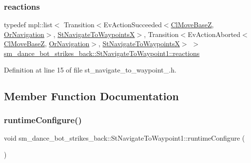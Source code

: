\subsubsection{\texorpdfstring{reactions}{reactions}}
{\footnotesize\ttfamily typedef mpl\+::list$<$ Transition$<$Ev\+Action\+Succeeded$<$\hyperlink{classmove__base__z__client_1_1ClMoveBaseZ}{Cl\+Move\+BaseZ}, \hyperlink{classsm__dance__bot__strikes__back_1_1OrNavigation}{Or\+Navigation}$>$, \hyperlink{structsm__dance__bot__strikes__back_1_1StNavigateToWaypointsX}{St\+Navigate\+To\+WaypointsX}$>$, Transition$<$Ev\+Action\+Aborted$<$\hyperlink{classmove__base__z__client_1_1ClMoveBaseZ}{Cl\+Move\+BaseZ}, \hyperlink{classsm__dance__bot__strikes__back_1_1OrNavigation}{Or\+Navigation}$>$, \hyperlink{structsm__dance__bot__strikes__back_1_1StNavigateToWaypointsX}{St\+Navigate\+To\+WaypointsX}$>$ $>$ \hyperlink{structsm__dance__bot__strikes__back_1_1StNavigateToWaypoint1_a6345cdcfe23da575ea59d70abe738ce1}{sm\+\_\+dance\+\_\+bot\+\_\+strikes\+\_\+back\+::\+St\+Navigate\+To\+Waypoint1\+::reactions}}



Definition at line 15 of file st\+\_\+navigate\+\_\+to\+\_\+waypoint\+\_.\+h.



\subsection{Member Function Documentation}
\mbox{\label{structsm__dance__bot__strikes__back_1_1StNavigateToWaypoint1_ab12f2e6a60fa398d45db6249618c1dcf}} 
\subsubsection{\texorpdfstring{runtime\+Configure()}{runtimeConfigure()}}
{\footnotesize\ttfamily void sm\+\_\+dance\+\_\+bot\+\_\+strikes\+\_\+back\+::\+St\+Navigate\+To\+Waypoint1\+::runtime\+Configure (\begin{DoxyParamCaption}{ }\end{DoxyParamCaption})\hspace{0.3cm}{\ttfamily [inline]}}




